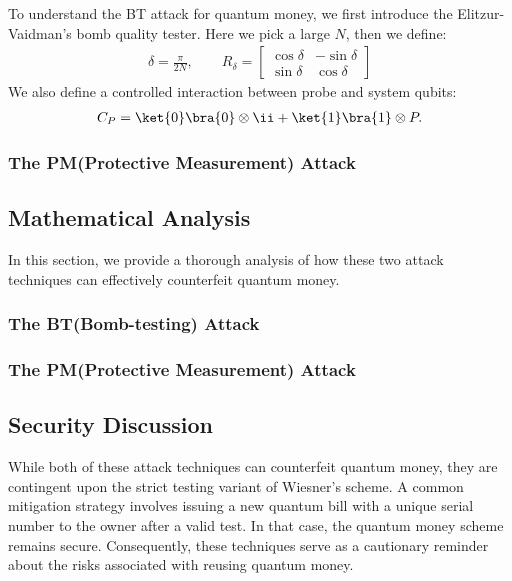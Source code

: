 \documentclass{article} %
\begin{document}
To understand the BT attack for quantum money, we first introduce the Elitzur-Vaidman’s bomb quality tester. Here we pick a large $N$, then we define:
\begin{align}
	\delta = \frac{\pi}{2N}, \qquad
	R_\delta = \begin{bmatrix}
	    \cos \delta&-\sin \delta\\\sin \delta&\cos \delta
	\end{bmatrix} \label{delta}
\end{align}
We also define a controlled interaction between probe and system qubits:
\begin{align}
	C_P = \ket{0}\bra{0} \otimes \ii + \ket{1}\bra{1} \otimes P. \label{probe}
\end{align}


\subsubsection{The PM(Protective Measurement) Attack}

\subsection{Mathematical Analysis}

In this section, we provide a thorough analysis of how these two attack techniques can effectively counterfeit quantum money.

\subsubsection{The BT(Bomb-testing) Attack}

\subsubsection{The PM(Protective Measurement) Attack}

\subsection{Security Discussion}

While both of these attack techniques can counterfeit quantum money, they are contingent upon the strict testing variant of Wiesner’s scheme. A common mitigation strategy involves issuing a new quantum bill with a unique serial number to the owner after a valid test. In that case, the quantum money scheme remains secure. Consequently, these techniques serve as a cautionary reminder about the risks associated with reusing quantum money.
\end{document}

